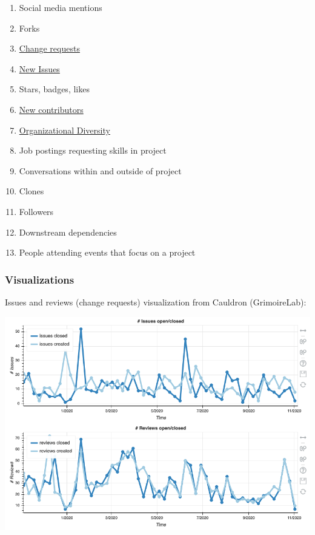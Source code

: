 \begin{enumerate}
\def\labelenumi{\arabic{enumi}.}
\tightlist
\item
  Social media mentions
\item
  Forks
\item
  \href{https://chaoss.community/metric-change-requests/}{Change
  requests}
\item
  \href{https://chaoss.community/metric-issues-new/}{New Issues}
\item
  Stars, badges, likes
\item
  \href{https://chaoss.community/metric-new-contributors/}{New
  contributors}
\item
  \href{https://chaoss.community/metric-organizational-diversity/}{Organizational
  Diversity}
\item
  Job postings requesting skills in project
\item
  Conversations within and outside of project
\item
  Clones
\item
  Followers
\item
  Downstream dependencies
\item
  People attending events that focus on a project
\end{enumerate}

\hypertarget{visualizations}{%
\subsubsection{Visualizations}\label{visualizations}}

Issues and reviews (change requests) visualization from Cauldron
(GrimoireLab):

\includegraphics{images/project-popularity_issues-and-reviews.png}


